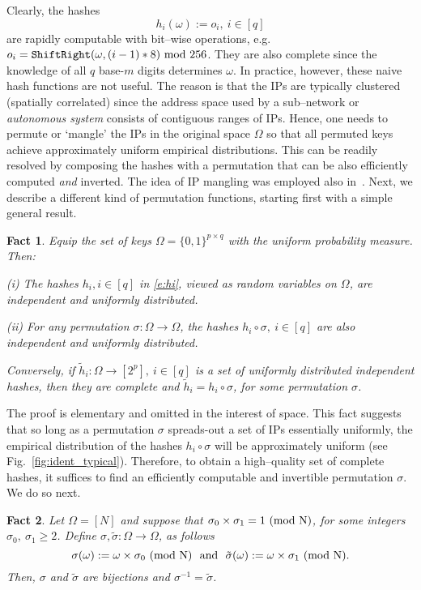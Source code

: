 \documentclass[10pt, conference, letterpaper,onecolumn]{IEEEtranv1.8}
\theoremstyle{plain}\newtheorem{thm}{Theorem}\newtheorem{lem}{Lemma}
\newtheorem{fact}{Fact}
\theoremstyle{definition}
\begin{document}
Clearly, the hashes 
\begin{equation}\label{e:hi}
h_i(\omega):= o_i,\ i\in [q]
\end{equation}
are rapidly computable with bit--wise operations, e.g.\ $o_i  = {\tt ShiftRight}(\omega, (i-1)*8)\ {\rm mod}\ 256$.  They are also complete since
the knowledge of all $q$ base-$m$ digits determines $\omega$. In practice, however, these naive hash functions are not useful. The reason
is that the IPs are typically clustered (spatially correlated) since the address space used by a sub--network or \emph{autonomous system}
consists of contiguous ranges of IPs. Hence, one needs to permute or `mangle' the IPs
in the original space $\Omega$ so that all permuted keys achieve approximately uniform empirical distributions.
This can be readily resolved by composing the hashes with a permutation that can be also efficiently 
computed {\em and} inverted.  The idea of IP mangling was employed also in~\cite{4146856}. 
Next, we describe a different kind of permutation functions, starting first with a simple general result.

\begin{fact}  Equip the set of keys $\Omega = \{0,1\}^{p\times q}$ with the uniform probability measure. Then:

 {\rm (i)} The hashes $h_i, i\in [q]$ in \eqref{e:hi}, viewed as random variables on $\Omega$,
  are independent and uniformly distributed.
 
 {\rm (ii)} For any permutation $\sigma:\Omega\to\Omega$, the hashes $h_i\circ \sigma,\ i\in[q]$ are also independent
 and uniformly distributed.
 
Conversely, if $\tilde h_i:\Omega \to [2^p],\ i\in[q]$ is a set of uniformly distributed independent hashes, then they are complete and
$\tilde h_i = h_i\circ \sigma$, for some permutation $\sigma$.
\end{fact}

\noindent The proof is elementary and omitted in the interest of space. This fact suggests that so long as a permutation $\sigma$ spreads-out 
a set of IPs essentially uniformly, the empirical distribution of the hashes $h_i\circ \sigma$ will be approximately uniform (see Fig.~\ref{fig:ident_typical}).
Therefore, to obtain a high--quality set of complete hashes, it suffices to find an efficiently computable and invertible permutation $\sigma$. 
We do so next.

\begin{fact} \label{f:RSA} Let $\Omega = [N]$ and suppose that $\sigma_0 \times \sigma_1 = 1 \ (\rm{mod }\ N)$, for some integers 
$\sigma_0,\ \sigma_1\ge 2$. Define $\sigma, \tilde \sigma :\Omega \to \Omega$, as follows
$$
\sigma (\omega) := \omega \times \sigma_0 \ (\rm{mod }\ N)
\ \mbox{ and }\ 
\tilde\sigma (\omega) := \omega \times \sigma_1 \ (\rm{mod }\ N). 
$$
Then,  $\sigma$ and $\tilde \sigma$ are bijections and $\sigma^{-1} = \tilde \sigma$.
\end{fact}
\end{document}
